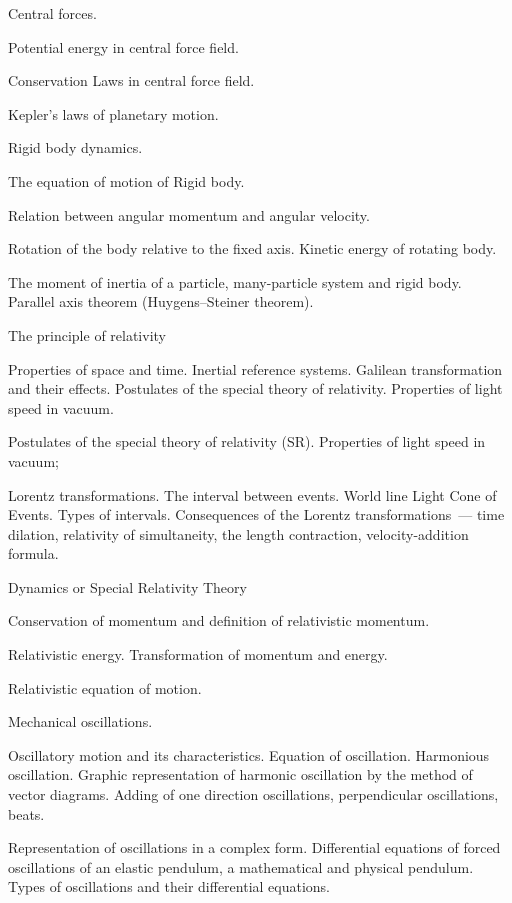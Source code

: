 \documentclass{rnp}
\begin{document}
\begin{Rozdil}
	\begin{Rozdil}
	\item Central forces.
	\item Potential energy in central force field.
	\item Conservation Laws in central force field.
	\item Kepler's laws of planetary motion.
	\end{Rozdil}
\item Rigid body dynamics.
	\begin{Rozdil}
	\item The equation of motion of Rigid body.
	\item Relation between angular momentum and angular velocity.
	\item Rotation of the body relative to the fixed axis. Kinetic energy of rotating body.
	\item The moment of inertia of a particle, many-particle system and rigid body. Parallel axis theorem (Huygens–Steiner theorem).
	\end{Rozdil}
\item The principle of relativity
	\begin{Rozdil}
	\item Properties of space and time. Inertial reference systems. Galilean transformation and their effects. Postulates of the special theory of relativity. Properties of light speed in vacuum.
	\item Postulates of the special theory of relativity (SR). Properties of light speed in vacuum;
	\item  Lorentz transformations. The interval between events. World line Light Cone of Events. Types of intervals. Consequences of the Lorentz transformations~--- time dilation, relativity of simultaneity, the length contraction, velocity-addition formula.
	\end{Rozdil}
\item Dynamics or Special Relativity Theory
	\begin{Rozdil}
	\item Conservation of momentum and definition of relativistic momentum.
	\item Relativistic energy. 	Transformation of momentum and energy.
	\item Relativistic equation of motion.
	\end{Rozdil}
\item Mechanical oscillations.
	\begin{Rozdil}
	\item Oscillatory motion and its characteristics.
	Equation of oscillation. Harmonious oscillation. Graphic representation of harmonic oscillation by the method of vector diagrams.  Adding of one direction oscillations, perpendicular oscillations, beats.
	\item 	Representation of oscillations in a complex form. Differential equations of forced oscillations of an elastic pendulum, a mathematical and physical pendulum. Types of oscillations and their differential equations.
	\end{Rozdil}
\end{Rozdil}
\end{document}
